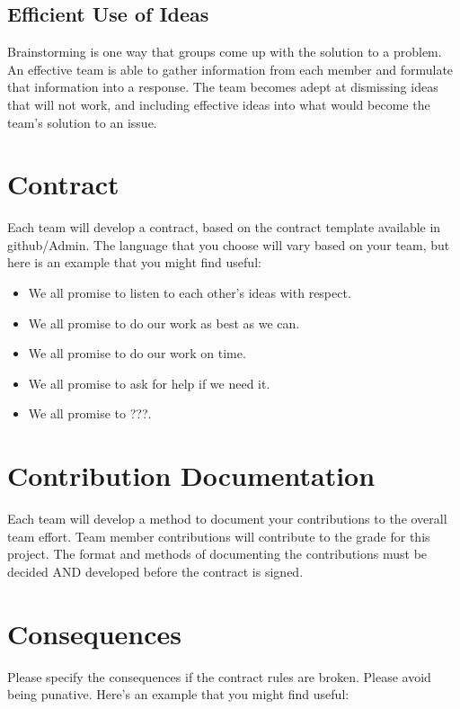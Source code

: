\documentclass{article}\usepackage[]{graphicx}\usepackage[]{color}
\begin{document}
\subsection{Efficient Use of Ideas}

Brainstorming is one way that groups come up with the solution to a problem. An effective team is able to gather information from each member and formulate that information into a response. The team becomes adept at dismissing ideas that will not work, and including effective ideas into what would become the team's solution to an issue.

\section{Contract}

Each team will develop a contract, based on the contract template available in github/Admin. The language that you choose will vary based on your team, but here is an example that you might find useful:

\begin{itemize}
  \item We all promise to listen to each other's ideas with respect.
  \item We all promise to do our work as best as we can.
  \item We all promise to do our work on time.
  \item We all promise to ask for help if we need it.
  \item We all promise to ???.
\end{itemize}

\section{Contribution Documentation}

Each team will develop a method to document your contributions to the overall team effort. Team member contributions will contribute to the grade for this project. The format and methods of documenting the contributions must be decided AND developed before the contract is signed.

\section{Consequences}

Please specify the consequences if the contract rules are broken. Please avoid being punative. Here's an example that you might find useful:
\end{document}
